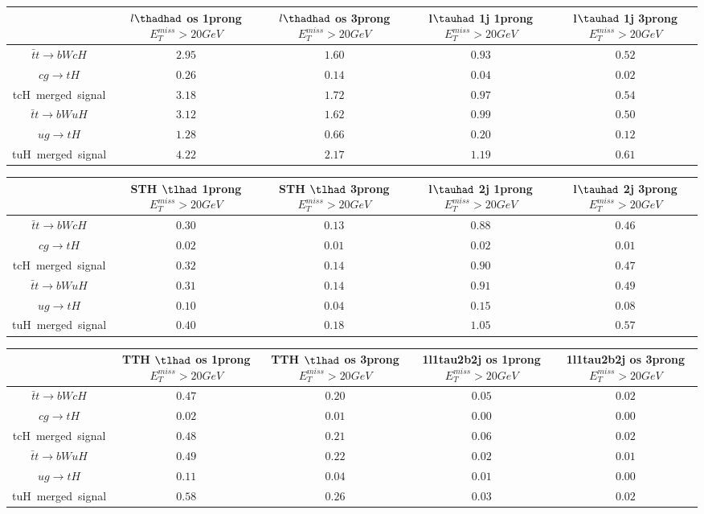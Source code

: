 \centering
\begin{tabular}{|c|c|c|c|c|} \hline
 & $l\thadhad$ os 1prong  $E_T^{miss}>20GeV$ & $l\thadhad$ os 3prong  $E_T^{miss}>20GeV$ & l$\tauhad$ 1j 1prong  $E_T^{miss}>20GeV$ & l$\tauhad$ 1j 3prong  $E_T^{miss}>20GeV$\\\hline
$\bar{t}t\to bWcH$ & $2.95$ & $1.60$ & $0.93$ & $0.52$\\\hline
$cg\to tH$ & $0.26$ & $0.14$ & $0.04$ & $0.02$\\\hline
tcH~merged~signal & $3.18$ & $1.72$ & $0.97$ & $0.54$\\\hline
$\bar{t}t\to bWuH$ & $3.12$ & $1.62$ & $0.99$ & $0.50$\\\hline
$ug\to tH$ & $1.28$ & $0.66$ & $0.20$ & $0.12$\\\hline
tuH~merged~signal & $4.22$ & $2.17$ & $1.19$ & $0.61$\\\hline
\end{tabular}
\begin{tabular}{|c|c|c|c|c|} \hline
 & STH $\tlhad$  1prong  $E_T^{miss}>20GeV$ & STH $\tlhad$  3prong  $E_T^{miss}>20GeV$ & l$\tauhad$ 2j 1prong  $E_T^{miss}>20GeV$ & l$\tauhad$ 2j 3prong  $E_T^{miss}>20GeV$\\\hline
$\bar{t}t\to bWcH$ & $0.30$ & $0.13$ & $0.88$ & $0.46$\\\hline
$cg\to tH$ & $0.02$ & $0.01$ & $0.02$ & $0.01$\\\hline
tcH~merged~signal & $0.32$ & $0.14$ & $0.90$ & $0.47$\\\hline
$\bar{t}t\to bWuH$ & $0.31$ & $0.14$ & $0.91$ & $0.49$\\\hline
$ug\to tH$ & $0.10$ & $0.04$ & $0.15$ & $0.08$\\\hline
tuH~merged~signal & $0.40$ & $0.18$ & $1.05$ & $0.57$\\\hline
\end{tabular}
\begin{tabular}{|c|c|c|c|c|} \hline
 & TTH $\tlhad$ os 1prong  $E_T^{miss}>20GeV$ & TTH $\tlhad$ os 3prong  $E_T^{miss}>20GeV$ & 1l1tau2b2j os 1prong  $E_T^{miss}>20GeV$ & 1l1tau2b2j os 3prong  $E_T^{miss}>20GeV$\\\hline
$\bar{t}t\to bWcH$ & $0.47$ & $0.20$ & $0.05$ & $0.02$\\\hline
$cg\to tH$ & $0.02$ & $0.01$ & $0.00$ & $0.00$\\\hline
tcH~merged~signal & $0.48$ & $0.21$ & $0.06$ & $0.02$\\\hline
$\bar{t}t\to bWuH$ & $0.49$ & $0.22$ & $0.02$ & $0.01$\\\hline
$ug\to tH$ & $0.11$ & $0.04$ & $0.01$ & $0.00$\\\hline
tuH~merged~signal & $0.58$ & $0.26$ & $0.03$ & $0.02$\\\hline
\end{tabular}
